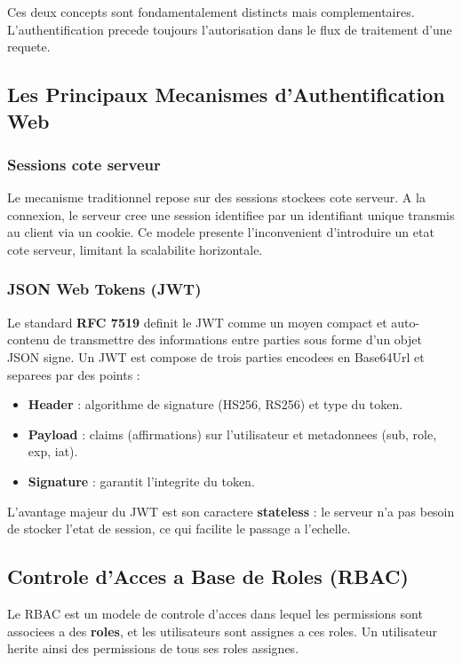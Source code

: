 \documentclass[12pt,a4paper]{report}
\begin{document}
Ces deux concepts sont fondamentalement distincts mais complementaires.
L'authentification precede toujours l'autorisation dans le flux de
traitement d'une requete.

\subsection{Les Principaux Mecanismes d'Authentification Web}

\subsubsection{Sessions cote serveur}

Le mecanisme traditionnel repose sur des sessions stockees cote serveur.
A la connexion, le serveur cree une session identifiee par un identifiant
unique transmis au client via un cookie. Ce modele presente l'inconvenient
d'introduire un etat cote serveur, limitant la scalabilite horizontale.

\subsubsection{JSON Web Tokens (JWT)}

Le standard \textbf{RFC 7519} definit le JWT comme un moyen compact et
auto-contenu de transmettre des informations entre parties sous forme d'un
objet JSON signe. Un JWT est compose de trois parties encodees en
Base64Url et separees par des points :

\begin{itemize}
  \item \textbf{Header} : algorithme de signature (HS256, RS256) et type
        du token.
  \item \textbf{Payload} : claims (affirmations) sur l'utilisateur et
        metadonnees (sub, role, exp, iat).
  \item \textbf{Signature} : garantit l'integrite du token.
\end{itemize}

L'avantage majeur du JWT est son caractere \textbf{stateless} : le
serveur n'a pas besoin de stocker l'etat de session, ce qui facilite le
passage a l'echelle.

\subsection{Controle d'Acces a Base de Roles (RBAC)}

Le RBAC est un modele de controle d'acces dans lequel les permissions
sont associees a des \textbf{roles}, et les utilisateurs sont assignes
a ces roles. Un utilisateur herite ainsi des permissions de tous ses
roles assignes.
\end{document}
